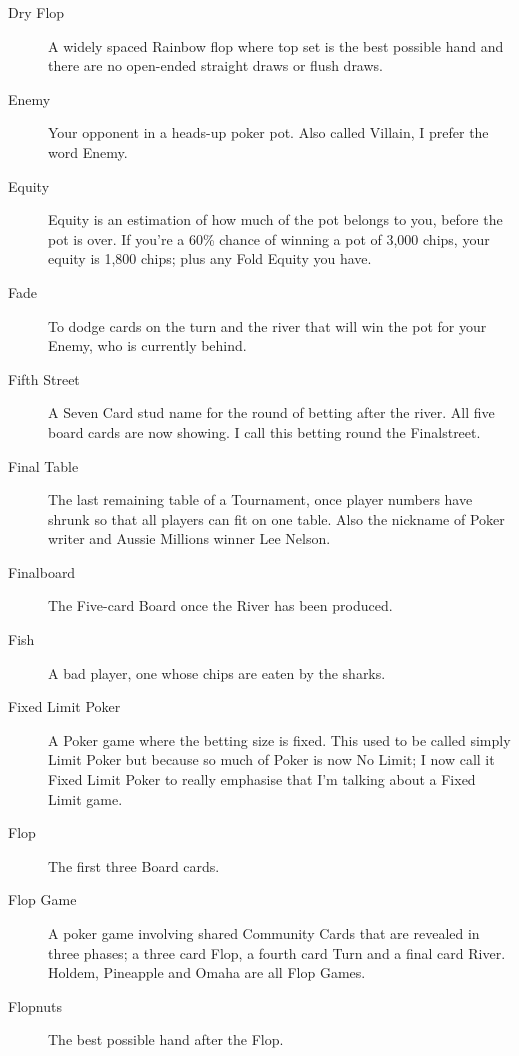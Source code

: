 \begin{description}
\item[Dry Flop] A widely spaced Rainbow flop where top set is the best
possible hand and there are no open-ended straight draws or flush
draws.

\item[Enemy] Your opponent in a heads-up poker pot. Also called
Villain, I prefer the word Enemy.

\item[Equity] Equity is an estimation of how much of the pot belongs
to you, before the pot is over. If you're a 60\% chance of winning a
pot of 3,000 chips, your equity is 1,800 chips; plus any Fold Equity
you have.

\item[Fade] To dodge cards on the turn and the river that will win the
pot for your Enemy, who is currently behind.

\item[Fifth Street] A Seven Card stud name for the round of betting
after the river. All five board cards are now showing. I call this betting
round the Finalstreet.

\item[Final Table] The last remaining table of a Tournament, once
player numbers have shrunk so that all players can fit on one
table. Also the nickname of Poker writer and Aussie Millions winner
Lee Nelson.

\item[Finalboard] The Five-card Board once the River has been
produced.

\item[Fish] A bad player, one whose chips are eaten by the sharks.

\item[Fixed Limit Poker] A Poker game where the betting size is
fixed. This used to be called simply Limit Poker but because so much
of Poker is now No Limit; I now call it Fixed Limit Poker to really
emphasise that I'm talking about a Fixed Limit game.

\item[Flop] The first three Board cards.

\item[Flop Game] A poker game involving shared Community Cards that
are revealed in three phases; a three card Flop, a fourth card Turn
and a final card River. Holdem, Pineapple and Omaha are all Flop
Games.

\item[Flopnuts] The best possible hand after the Flop.


\end{description}
